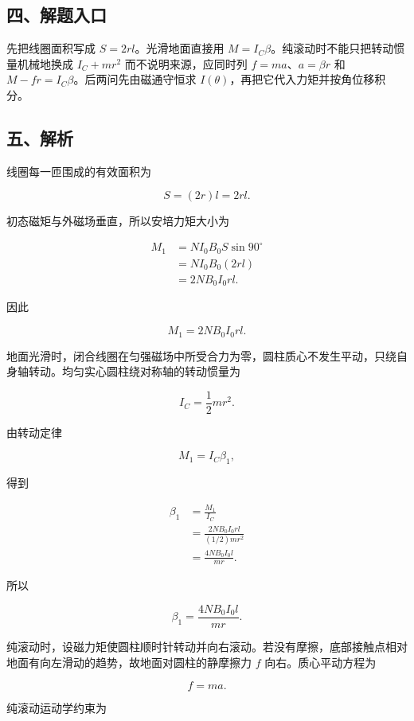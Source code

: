 \documentclass[12pt,a4paper,UTF8]{ctexart}
\begin{document}
\subsection{四、解题入口}\label{ux56dbux89e3ux9898ux5165ux53e3-4}

先把线圈面积写成 \(S=2rl\)。光滑地面直接用
\(M=I_C\beta\)。纯滚动时不能只把转动惯量机械地换成 \(I_C+mr^2\)
而不说明来源，应同时列 \(f=ma\)、\(a=\beta r\) 和
\(M-fr=I_C\beta\)。后两问先由磁通守恒求
\(I(\theta)\)，再把它代入力矩并按角位移积分。

\subsection{五、解析}\label{ux4e94ux89e3ux6790-4}

线圈每一匝围成的有效面积为

\[
S=(2r)l=2rl. \tag{1}
\]

初态磁矩与外磁场垂直，所以安培力矩大小为

\[
\begin{aligned}
M_1
&=NI_0B_0S\sin90^\circ\\
&=NI_0B_0(2rl)\\
&=2NB_0I_0rl.
\end{aligned} \tag{2}
\]

因此

\[
\boxed{M_1=2NB_0I_0rl}. \tag{3}
\]

地面光滑时，闭合线圈在匀强磁场中所受合力为零，圆柱质心不发生平动，只绕自身轴转动。均匀实心圆柱绕对称轴的转动惯量为

\[
I_C=\frac12mr^2. \tag{4}
\]

由转动定律

\[
M_1=I_C\beta_1, \tag{5}
\]

得到

\[
\begin{aligned}
\beta_1
&=\frac{M_1}{I_C}\\
&=\frac{2NB_0I_0rl}{(1/2)mr^2}\\
&=\frac{4NB_0I_0l}{mr}.
\end{aligned} \tag{6}
\]

所以

\[
\boxed{\beta_1=\frac{4NB_0I_0l}{mr}}. \tag{7}
\]

纯滚动时，设磁力矩使圆柱顺时针转动并向右滚动。若没有摩擦，底部接触点相对地面有向左滑动的趋势，故地面对圆柱的静摩擦力
\(f\) 向右。质心平动方程为

\[
f=ma. \tag{8}
\]

纯滚动运动学约束为
\end{document}
